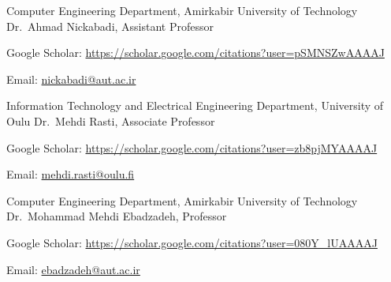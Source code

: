 \begin{cventries}
  \cventry
    {Computer Engineering Department, Amirkabir University of Technology} %
    {Dr.~Ahmad Nickabadi, Assistant Professor} %
    {} %
    {} %
    {
      \begin{cvitems} %
        \item {Google Scholar: \href{https://scholar.google.com/citations?user=pSMNSZwAAAAJ&hl=en}{https://scholar.google.com/citations?user=pSMNSZwAAAAJ}}
        \item {Email: \href{mailto:nickabadi@aut.ac.ir}{nickabadi@aut.ac.ir}}
      \end{cvitems}
    }

  \cventry
    {Information Technology and Electrical Engineering Department, University of Oulu} %
    {Dr.~Mehdi Rasti, Associate Professor} %
    {} %
    {} %
    {
      \begin{cvitems} %
        \item {Google Scholar: \href{https://scholar.google.com/citations?user=zb8pjMYAAAAJ&hl=en}{https://scholar.google.com/citations?user=zb8pjMYAAAAJ}}
        \item {Email: \href{mailto:mehdi.rasti@oulu.fi}{mehdi.rasti@oulu.fi}}
      \end{cvitems}
    }


  \cventry
    {Computer Engineering Department, Amirkabir University of Technology} %
    {Dr.~Mohammad Mehdi Ebadzadeh, Professor} %
    {} %
    {} %
    {
      \begin{cvitems} %
        \item {Google Scholar: \href{https://scholar.google.com/citations?user=080Y\_lUAAAAJ&hl=en}{https://scholar.google.com/citations?user=080Y\_lUAAAAJ}}
        \item {Email: \href{mailto:ebadzadeh@aut.ac.ir}{ebadzadeh@aut.ac.ir}}
      \end{cvitems}
    }


\end{cventries}
